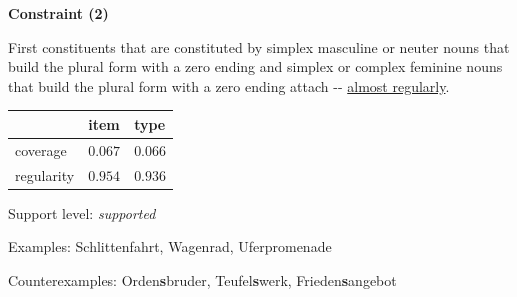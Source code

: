 \vspace{0.4em}

\begin{center}
\textbf{Constraint (2)}
\end{center}

\noindent
First constituents that are constituted by simplex masculine or neuter nouns that build the plural form with a zero ending and simplex or complex feminine nouns that build the plural form with a zero ending attach \mbox{-{\zeroLinker}-} \underline{almost regularly}.
\vspace{0.35em}


\vspace{-0.35em}

\begin{table}[!ht]
\begin{center}

\begin{tabularx}{\columnwidth}{|X|X|X|}
\hline
 & item & type \\
\hline
 coverage & $0.067$ & $0.066$ \\
\hline
 regularity & $0.954$ & $0.936$ \\
\hline
\end{tabularx}
\end{center}
\end{table}

\vspace{-1.35em}

\noindent
Support level: \textit{supported}

\vspace{0.3em}

\noindent
Examples: Schlitten{\zeroLinker}fahrt, Wagen{\zeroLinker}rad, Ufer{\zeroLinker}promenade

\noindent
Counterexamples: Orden\textbf{s}bruder, Teufel\textbf{s}werk, Frieden\textbf{s}angebot

\vspace{0.3em}

